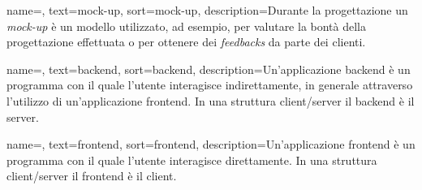 
\renewcommand{\acronymname}{Acronimi e abbreviazioni}


%


%

{
    name=,
    text=mock-up,
    sort=mock-up,
    description={Durante la progettazione un \emph{mock-up} è un modello utilizzato, ad esempio, per valutare la bontà della progettazione effettuata o per ottenere dei \emph{feedbacks} da parte dei clienti.}
}

{
    name=,
    text=backend,
    sort=backend,
    description={Un'applicazione backend è un programma con il quale l'utente interagisce indirettamente, in generale attraverso l'utilizzo di un'applicazione \gls{frontend}. In una struttura client/server il backend è il server.}
}

{
    name=,
    text=frontend,
    sort=frontend,
    description={Un'applicazione frontend è un programma con il quale l'utente interagisce direttamente. In una struttura client/server il frontend è il client.}
}
